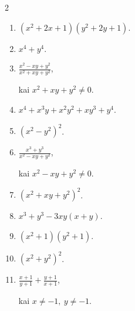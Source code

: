 \documentclass[11pt,a4paper]{article}
\begin{document}
\begin{multicols}{2}
\begin{enumerate}[start=1]
\item \(\displaystyle (x^2+2x+1)(y^2+2y+1)\).
\item \(\displaystyle x^4+y^4\).
\item \(\displaystyle \frac{x^2-xy+y^2}{x^2+xy+y^2}\),\par\nopagebreak\smallskip kai \(x^2+xy+y^2\ne0\).
\item \(\displaystyle x^4+x^3y+x^2y^2+xy^3+y^4\).
\item \(\displaystyle (x^2-y^2)^2\).
\item \(\displaystyle \frac{x^3+y^3}{x^2-xy+y^2}\),\par\nopagebreak\smallskip kai \(x^2-xy+y^2\ne0\).
\item \(\displaystyle (x^2+xy+y^2)^2\).
\item \(\displaystyle x^3+y^3-3xy(x+y)\).
\item \(\displaystyle (x^2+1)(y^2+1)\).
\item \(\displaystyle (x^2+y^2)^2\).
\item \(\displaystyle \frac{x+1}{y+1}+\frac{y+1}{x+1}\),\par\nopagebreak\smallskip kai \(x\ne-1,\ y\ne-1\).
\end{enumerate}
\end{multicols}
\clearpage
\end{document}
